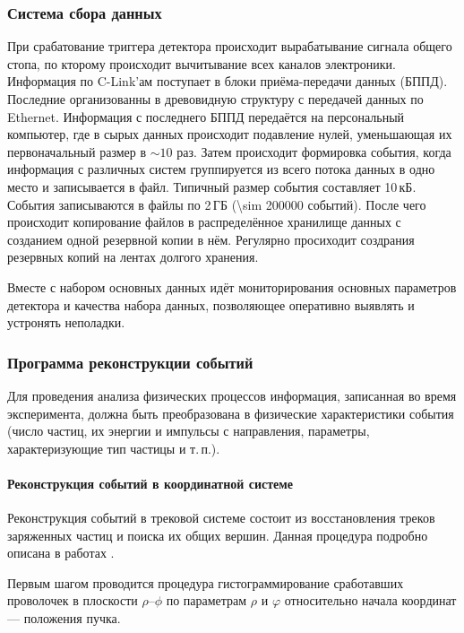 \subsubsection{Система сбора данных}
\label{sec:daq}

При срабатование триггера детектора происходит вырабатывание сигнала общего стопа,
по кторому происходит вычитывание всех каналов электроники.
Информация по C-Link'ам поступает в блоки приёма-передачи данных (БППД).
Последние организованны в древовидную структуру с передачей данных по Ethernet.
Информация с последнего БППД передаётся на персональный компьютер,
где в сырых данных происходит подавление нулей,
уменьшающая их первоначальный размер в $\sim 10$ раз.
Затем происходит формировка события,
когда информация с различных систем группируется из всего потока данных в одно место и записывается в файл.
Типичный размер события составляет 10\,кБ.
События записываются в файлы по 2\,ГБ (\num{\sim 200000} событий).
После чего происходит копирование файлов в распределённое хранилище данных с созданием одной резервной копии в нём.
Регулярно просиходит создрания резервных копий на лентах долгого хранения.

Вместе с набором основных данных идёт мониторирования основных параметров детектора и качества набора данных,
позволяющее оперативно выявлять и устронять неполадки.




\subsubsection{Программа реконструкции событий}
\label{sec:event_reco}


Для проведения анализа физических процессов информация,
записанная во время эксперимента,
должна быть преобразована в физические характеристики события
(число частиц,
их энергии и импульсы с направления,
параметры,
характеризующие тип частицы и т.\,п.).


\paragraph{Реконструкция событий в координатной системе}

Реконструкция событий в трековой системе состоит из восстановления треков заряженных частиц и поиска их общих вершин.
Данная процедура подробно описана в работах \cite{Karawdina:2007:track_reco}.


Первым шагом проводится процедура гистограммирование сработавших проволочек
в плоскости $\rho$--$\phi$ по параметрам $\rho$ и $\varphi$ относительно начала координат
--- положения пучка.

